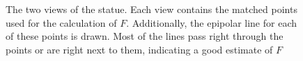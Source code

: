 \documentclass[11pt,a4paper]{article}
\begin{document}
\begin{figure}

\caption{The two views of the statue. Each view contains the matched points used for the calculation of $F$. Additionally, the epipolar line for each of these points is drawn. Most of the lines pass right through the points or are right next to them, indicating a good estimate of $F$}%
\label{fig:4}
\end{figure}
\end{document}
